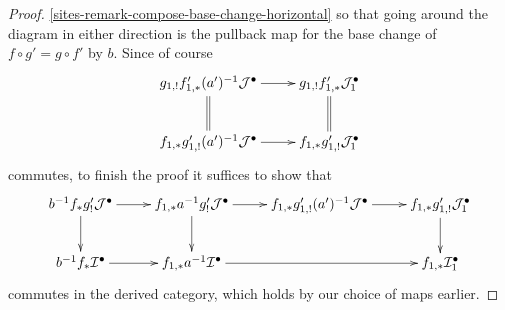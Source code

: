 \documentclass{stacks-project}
\theoremstyle{plain}
\theoremstyle{definition}
\theoremstyle{remark}
\numberwithin{equation}{subsection}
\begin{document}
\begin{proof}
\ref{sites-remark-compose-base-change-horizontal}
so that going around the diagram in either direction is the pullback
map for the base change of $f \circ g' = g \circ f'$ by $b$.
Since of course
$$
\xymatrix{
g_{1, !}f'_{1, *}(a')^{-1}\mathcal{J}^\bullet \ar@{=}[d] \ar[r] &
g_{1, !}f'_{1, *}\mathcal{J}_1^\bullet \ar@{=}[d] \\
f_{1, *}g'_{1, !}(a')^{-1}\mathcal{J}^\bullet \ar[r] &
f_{1, *}g'_{1, !}\mathcal{J}_1^\bullet 
}
$$
commutes, to finish the proof it suffices to show that
$$
\xymatrix{
b^{-1}f_*g'_!\mathcal{J}^\bullet \ar[r] \ar[d] &
f_{1, *}a^{-1}g'_!\mathcal{J}^\bullet \ar[r] \ar[d] &
f_{1, *}g'_{1, !}(a')^{-1}\mathcal{J}^\bullet \ar[r] &
f_{1, *}g'_{1, !}\mathcal{J}_1^\bullet \ar[d] \\
b^{-1}f_*\mathcal{I}^\bullet \ar[r] &
f_{1, *}a^{-1}\mathcal{I}^\bullet \ar[rr] & &
f_{1, *}\mathcal{I}_1^\bullet
}
$$
commutes in the derived category, which holds by our choice of
maps earlier.
\end{proof}
\end{document}
